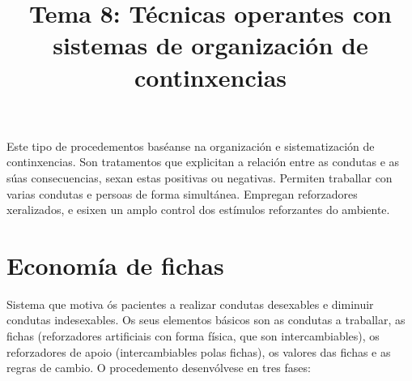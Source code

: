 \documentclass[a4paper,11pt]{article}
\title{Tema 8: Técnicas operantes con sistemas de organización de continxencias}
\date{}
\begin{document}
   

\maketitle 

Este tipo de procedementos baséanse na organización e sistematización de continxencias. Son tratamentos que explicitan a relación entre as condutas e as súas consecuencias, sexan estas positivas ou negativas. Permiten traballar con varias condutas e persoas de forma simultánea. Empregan reforzadores xeralizados, e esixen un amplo control dos estímulos reforzantes do ambiente.

\section{Economía de fichas}
Sistema que motiva ós pacientes a realizar condutas desexables e diminuir condutas indesexables. Os seus elementos básicos son as condutas a traballar, as fichas (reforzadores artificiais con forma física, que son intercambiables), os reforzadores de apoio (intercambiables polas fichas), os valores das fichas e as regras de cambio. O procedemento desenvólvese en tres fases:
\end{document}
